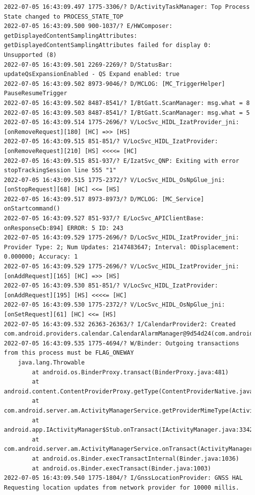 \documentclass[a4paper,12pt]{book}
\begin{document}
\begin{lstlisting}
2022-07-05 16:43:09.497 1775-3306/? D/ActivityTaskManager: Top Process State changed to PROCESS_STATE_TOP
2022-07-05 16:43:09.500 900-1037/? E/HWComposer: getDisplayedContentSamplingAttributes: getDisplayedContentSamplingAttributes failed for display 0: Unsupported (8)
2022-07-05 16:43:09.501 2269-2269/? D/StatusBar: updateQsExpansionEnabled - QS Expand enabled: true
2022-07-05 16:43:09.502 8973-9046/? D/MCLOG: [MC_TriggerHelper] PauseResumeTrigger
2022-07-05 16:43:09.502 8487-8541/? I/BtGatt.ScanManager: msg.what = 8
2022-07-05 16:43:09.503 8487-8541/? I/BtGatt.ScanManager: msg.what = 5
2022-07-05 16:43:09.514 1775-2696/? V/LocSvc_HIDL_IzatProvider_jni: [onRemoveRequest][180] [HC] =>> [HS]
2022-07-05 16:43:09.515 851-851/? V/LocSvc_HIDL_IzatProvider: [onRemoveRequest][210] [HS] <<<<= [HC]
2022-07-05 16:43:09.515 851-937/? E/IzatSvc_QNP: Exiting with error stopTrackingSession line 555 "1"
2022-07-05 16:43:09.515 1775-2372/? V/LocSvc_HIDL_OsNpGlue_jni: [onStopRequest][68] [HC] <<= [HS]
2022-07-05 16:43:09.517 8973-8973/? D/MCLOG: [MC_Service] onStartcommand()
2022-07-05 16:43:09.527 851-937/? E/LocSvc_APIClientBase: onResponseCb:894] ERROR: 5 ID: 243
2022-07-05 16:43:09.529 1775-2696/? D/LocSvc_HIDL_IzatProvider_jni: Provider Type: 2; Num Updates: 2147483647; Interval: 0Displacement: 0.000000; Accuracy: 1
2022-07-05 16:43:09.529 1775-2696/? V/LocSvc_HIDL_IzatProvider_jni: [onAddRequest][165] [HC] =>> [HS]
2022-07-05 16:43:09.530 851-851/? V/LocSvc_HIDL_IzatProvider: [onAddRequest][195] [HS] <<<<= [HC]
2022-07-05 16:43:09.530 1775-2372/? V/LocSvc_HIDL_OsNpGlue_jni: [onSetRequest][61] [HC] <<= [HS]
2022-07-05 16:43:09.532 26363-26363/? I/CalendarProvider2: Created com.android.providers.calendar.CalendarAlarmManager@9d54d24(com.android.providers.calendar.CalendarProvider2@b2b008d)
2022-07-05 16:43:09.535 1775-4694/? W/Binder: Outgoing transactions from this process must be FLAG_ONEWAY
    java.lang.Throwable
        at android.os.BinderProxy.transact(BinderProxy.java:481)
        at android.content.ContentProviderProxy.getType(ContentProviderNative.java:456)
        at com.android.server.am.ActivityManagerService.getProviderMimeType(ActivityManagerService.java:8169)
        at android.app.IActivityManager$Stub.onTransact(IActivityManager.java:3342)
        at com.android.server.am.ActivityManagerService.onTransact(ActivityManagerService.java:3092)
        at android.os.Binder.execTransactInternal(Binder.java:1036)
        at android.os.Binder.execTransact(Binder.java:1003)
2022-07-05 16:43:09.540 1775-1804/? I/GnssLocationProvider: GNSS HAL Requesting location updates from network provider for 10000 millis.

\end{lstlisting}
\end{document}

